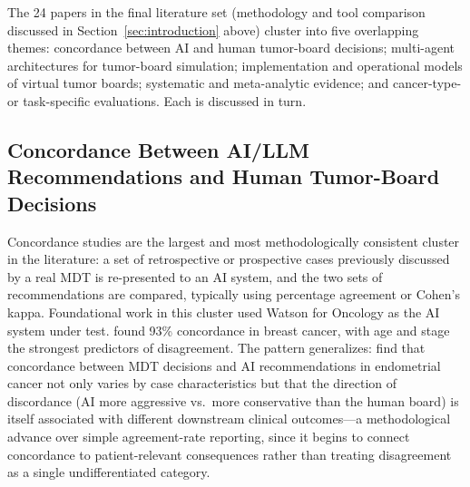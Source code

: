 \documentclass{article}
\begin{document}
The 24 papers in the final literature set (methodology and tool comparison discussed in Section~\ref{sec:introduction} above) cluster into five overlapping themes: concordance between AI and human tumor-board decisions; multi-agent architectures for tumor-board simulation; implementation and operational models of virtual tumor boards; systematic and meta-analytic evidence; and cancer-type- or task-specific evaluations. Each is discussed in turn.

\subsection{Concordance Between AI/LLM Recommendations and Human Tumor-Board Decisions}
\label{sec:concordance}

Concordance studies are the largest and most methodologically consistent cluster in the literature: a set of retrospective or prospective cases previously discussed by a real MDT is re-presented to an AI system, and the two sets of recommendations are compared, typically using percentage agreement or Cohen's kappa. Foundational work in this cluster used Watson for Oncology as the AI system under test. \citet{somashekhar2018} found 93\% concordance in breast cancer, with age and stage the strongest predictors of disagreement. The pattern generalizes: \citet{aliyev2026} find that concordance between MDT decisions and AI recommendations in endometrial cancer not only varies by case characteristics but that the direction of discordance (AI more aggressive vs.\ more conservative than the human board) is itself associated with different downstream clinical outcomes---a methodological advance over simple agreement-rate reporting, since it begins to connect concordance to patient-relevant consequences rather than treating disagreement as a single undifferentiated category.
\end{document}
